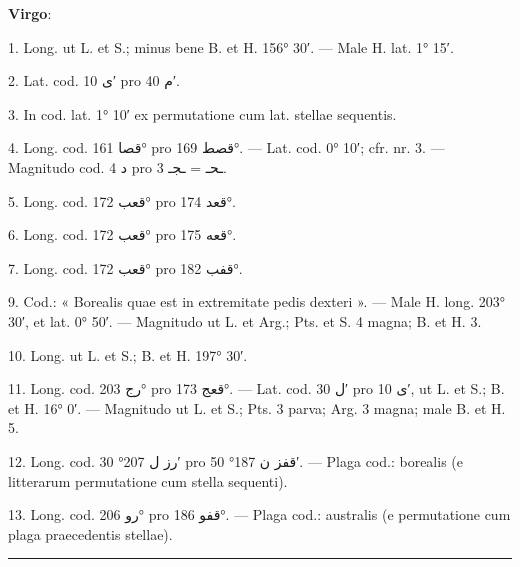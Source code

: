 \documentclass[11pt]{article}
\begin{document}
{\small
\par\hspace*{8mm}\textbf{Virgo}:
\par\hangindent=12mm 1. Long. ut L. et S.; minus bene B. et H. 156° 30′. — Male H. lat. 1° 15′.
\par\hangindent=12mm 2. Lat. cod. \textarabic{ى} 10′ pro \textarabic{م} 40′.
\par\hangindent=12mm 3. In cod. lat. 1° 10′ ex permutatione cum lat. stellae sequentis.
\par\hangindent=12mm 4. Long. cod. \textarabic{قصا} 161° pro \textarabic{قصط} 169°. — Lat. cod. 0° 10′; cfr. nr. 3. — Magnitudo cod. \textarabic{د} 4 pro \textarabic{ـحـ} = \textarabic{ـجـ} 3.
\par\hangindent=12mm 5. Long. cod. \textarabic{قعب} 172° pro \textarabic{قعد} 174°.
\par\hangindent=12mm 6. Long. cod. \textarabic{قعب} 172° pro \textarabic{قعه} 175°.
\par\hangindent=12mm 7. Long. cod. \textarabic{قعب} 172° pro \textarabic{قفب} 182°.
\par\hangindent=12mm 9. Cod.: « Borealis quae est in extremitate pedis dexteri ». — Male H. long. 203° 30′, et lat. 0° 50′. — Magnitudo ut L. et Arg.; Pts. et S. 4 magna; B. et H. 3.
\par\hangindent=12mm 10. Long. ut L. et S.; B. et H. 197° 30′.
\par\hangindent=12mm 11. Long. cod. \textarabic{رج} 203° pro \textarabic{قعج} 173°. — Lat. cod. \textarabic{ل} 30′ pro \textarabic{ى} 10′, ut L. et S.; B. et H. 16° 0′. — Magnitudo ut L. et S.; Pts. 3 parva; Arg. 3 magna; male B. et H. 5.
\par\hangindent=12mm 12. Long. cod. \textarabic{رز ل} 207° 30′ pro \textarabic{قفز ن} 187° 50′. — Plaga cod.: borealis (e litterarum permutatione cum stella sequenti).
\par\hangindent=12mm 13. Long. cod. \textarabic{رو} 206° pro \textarabic{قفو} 186°. — Plaga cod.: australis (e permutatione cum plaga praecedentis stellae).
\par}
\clearpage
\noindent{}\par\vspace{-1mm}\noindent\rule{\textwidth}{.4pt}\par\vspace{2mm}
\end{document}
